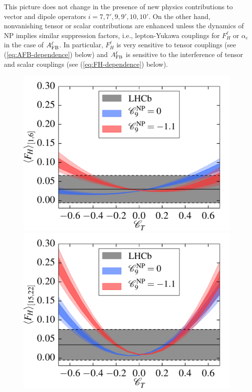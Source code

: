 \documentclass[twocolumn,epjc3]{svjour3}
\numberwithin{equation}{section}
\def \refeq#1{(\ref{#1})}
\renewcommand{\[}{\big[}
\renewcommand{\]}{\big]}
\renewcommand{\(}{\big(}
\renewcommand{\)}{\big)}
\newlength{\relwidth}
\begin{document}
This picture does not change in the presence of new physics contributions to
vector and dipole operators $i = 7,7',9,9',10,10'$. On the other hand,
nonvanishing tensor or scalar contributions are enhanced unless the dynamics of
NP implies similar suppression factors, i.e., lepton-Yukawa couplings for
$F_H^\ell$ or $\alpha_e$ in the case of $A_{\rm FB}^\ell$. In particular,
$F_H^\ell$ is very sensitive to tensor couplings (see \refeq{eq:AFB-dependence}
below) and $A_{\rm FB}^\ell$ is sensitive to the interference of tensor and
scalar couplings (see \refeq{eq:FH-dependence} below).

\begin{figure}
  \setlength{\relwidth}{0.33\textwidth}
  \begin{center}
    \includegraphics[width=\relwidth]{plots/pdf/ct_K_FH1to6}
    \includegraphics[width=\relwidth]{plots/pdf/ct_K_FH15to22}

\end{center}
\end{figure}
\end{document}
